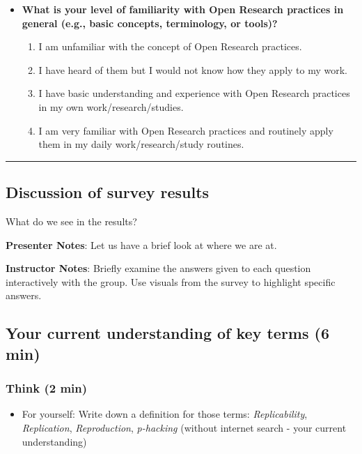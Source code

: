 \documentclass[
  english,
  letterpaper,
  DIV=11,
  numbers=noendperiod]{scrartcl}
\providecommand{\tightlist}{%
  \setlength{\itemsep}{0pt}\setlength{\parskip}{0pt}}
\begin{document}
\begin{itemize}
\item
  \textbf{What is your level of familiarity with Open Research practices
  in general (e.g., basic concepts, terminology, or tools)?}

  \begin{enumerate}
  \def\labelenumi{\alph{enumi}.}
  \item
    I am unfamiliar with the concept of Open Research practices.
  \item
    I have heard of them but I would not know how they apply to my work.
  \item
    I have basic understanding and experience with Open Research
    practices in my own work/research/studies.
  \item
    I am very familiar with Open Research practices and routinely apply
    them in my daily work/research/study routines.
  \end{enumerate}
\end{itemize}

\begin{center}\rule{0.5\linewidth}{0.5pt}\end{center}

\subsection{Discussion of survey
results}\label{discussion-of-survey-results}

What do we see in the results?

\textbf{Presenter Notes}: Let us have a brief look at where we are at.

\textbf{Instructor Notes}: Briefly examine the answers given to each
question interactively with the group. Use visuals from the survey to
highlight specific answers.

\subsection{Your current understanding of key terms (6
min)}\label{your-current-understanding-of-key-terms-6-min}

\subsubsection{Think (2 min)}\label{think-2-min}

\begin{itemize}
\tightlist
\item
  For yourself: Write down a definition for those terms:
  \emph{Replicability}, \emph{Replication}, \emph{Reproduction},
  \emph{p-hacking} {(without internet search - your current
  understanding)}
\end{itemize}
\end{document}
